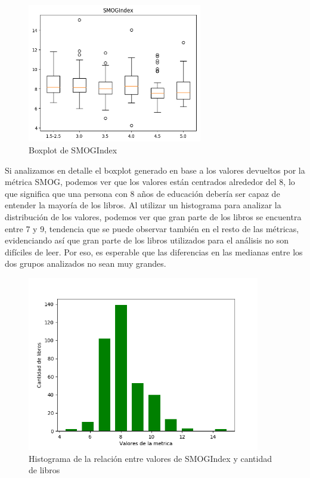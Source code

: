 \documentclass[12pt,journal,compsoc]{IEEEtran}
\begin{document}
\begin{figure}[H]
\begin{center}
  \includegraphics[width=3.0in]{../unigrams/scripts/boxplots/not-normalized-SMOGIndex.png}
  \caption{Boxplot de SMOGIndex}
  \end{center}
\end{figure}

Si analizamos en detalle el boxplot generado en base a los valores devueltos por la métrica SMOG, podemos ver que los valores están centrados alrededor del 8, lo que significa que una persona con 8 años de educación debería ser capaz de entender la mayoría de los libros. Al utilizar un histograma para analizar la distribución de los valores, podemos ver que gran parte de los libros se encuentra entre 7 y 9, tendencia que se puede observar también en el resto de las métricas, evidenciando así que gran parte de los libros utilizados para el análisis no son difíciles de leer. Por eso, es esperable que las diferencias en las medianas entre los dos grupos analizados no sean muy grandes.

\begin{figure}[H]
\begin{center}
  \includegraphics[width=4.0in]{../unigrams/scripts/histogram/08-SMOGIndexhistogram.png}
  \caption{Histograma de la relación entre valores de SMOGIndex y cantidad de libros}
  \end{center}
\end{figure}
\end{document}
